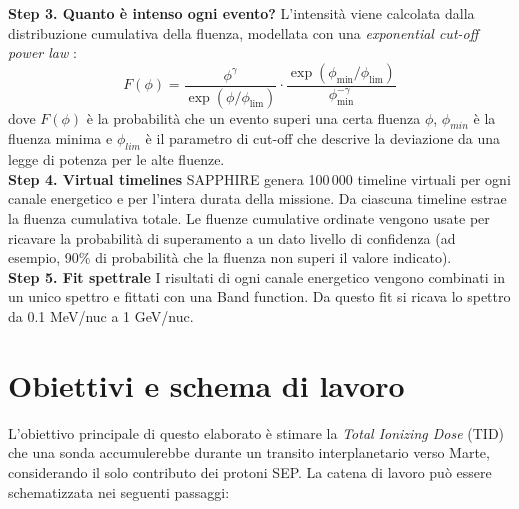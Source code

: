 \documentclass[12pt]{report}
\begin{document}
\textbf{Step 3. Quanto è intenso ogni evento?} L'intensità viene calcolata dalla distribuzione cumulativa della fluenza, modellata con una \textit{exponential cut-off power law} \cite{SAPPHIRE_paperJIggens}:
\begin{equation}
F(\phi) = \frac{\phi^{\gamma}}{\exp\!\left(\phi/\phi_{\mathrm{lim}}\right)} \cdot \frac{\exp\!\left(\phi_{\mathrm{min}}/\phi_{\mathrm{lim}}\right)}{\phi_{\mathrm{min}}^{-\gamma}}
\end{equation}
dove $F(\phi)$ è la probabilità che un evento superi una certa fluenza $\phi$, $\phi_{min}$ è la fluenza minima e $\phi_{lim}$ è il parametro di cut-off che descrive la deviazione da una legge di potenza per le alte fluenze. \\
\textbf{Step 4. Virtual timelines} SAPPHIRE genera 100\,000 timeline virtuali per ogni canale energetico e per l'intera durata della missione. Da ciascuna timeline estrae la fluenza cumulativa totale. Le fluenze cumulative ordinate vengono usate per ricavare la probabilità di superamento a un dato livello di confidenza (ad esempio, 90\% di probabilità che la fluenza non superi il valore indicato).\\
\textbf{Step 5. Fit spettrale} I risultati di ogni canale energetico vengono combinati in un unico spettro e fittati con una Band function. Da questo fit si ricava lo spettro da 0.1 MeV/nuc a 1 GeV/nuc.

\vspace{-10pt}
\section{Obiettivi e schema di lavoro}
\enlargethispage{2\baselineskip}
L'obiettivo principale di questo elaborato è stimare la \textit{Total Ionizing Dose} (TID) che una sonda accumulerebbe durante un transito interplanetario verso Marte, considerando il solo contributo dei protoni SEP. La catena di lavoro può essere schematizzata nei seguenti passaggi:
\end{document}
